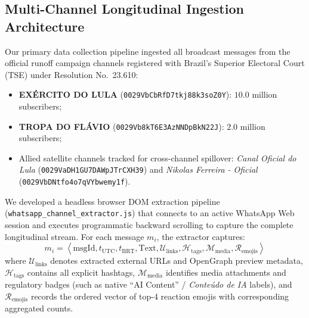 \documentclass[preprint,12pt]{elsarticle}
\begin{document}
\subsection{Multi-Channel Longitudinal Ingestion Architecture}
Our primary data collection pipeline ingested all broadcast messages from the official runoff campaign channels registered with Brazil's Superior Electoral Court (TSE) under Resolution No.\ 23.610:
\begin{itemize}
    \item \textbf{EXÉRCITO DO LULA} (\texttt{0029VbCbRfD7tkj88k3soZ0Y}): $10.0\text{ million}$ subscribers;
    \item \textbf{TROPA DO FLÁVIO} (\texttt{0029Vb8kT6E3AzNNDpBkN22J}): $2.0\text{ million}$ subscribers;
    \item Allied satellite channels tracked for cross-channel spillover: \textit{Canal Oficial do Lula} (\texttt{0029VaDH1GU7DAWpJTrCXH39}) and \textit{Nikolas Ferreira - Oficial} (\texttt{0029VbDNtfo4o7qVYbwemy1f}).
\end{itemize}

We developed a headless browser DOM extraction pipeline (\texttt{whatsapp\_channel\_extractor.js}) that connects to an active WhatsApp Web session and executes programmatic backward scrolling to capture the complete longitudinal stream. For each message $m_i$, the extractor captures:
\begin{equation}
m_i = \left\langle \text{msgId}, t_{\text{UTC}}, t_{\text{BRT}}, \text{Text}, \mathcal{U}_{\text{links}}, \mathcal{H}_{\text{tags}}, \mathcal{M}_{\text{media}}, \mathcal{R}_{\text{emojis}} \right\rangle
\end{equation}
where $\mathcal{U}_{\text{links}}$ denotes extracted external URLs and OpenGraph preview metadata, $\mathcal{H}_{\text{tags}}$ contains all explicit hashtags, $\mathcal{M}_{\text{media}}$ identifies media attachments and regulatory badges (such as native ``AI Content'' / \textit{Conteúdo de IA} labels), and $\mathcal{R}_{\text{emojis}}$ records the ordered vector of top-4 reaction emojis with corresponding aggregated counts.
\end{document}
